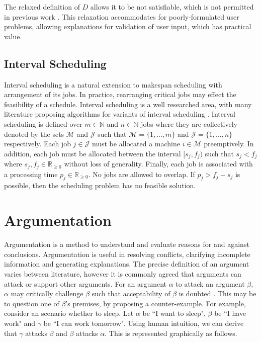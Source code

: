 The relaxed definition of $D$ allows it to be not satisfiable, which is not permitted in previous work \cite{aes}. This relaxation accommodates for poorly-formulated user problems, allowing explanations for validation of user input, which has practical value.

\subsection{Interval Scheduling}

Interval scheduling is a natural extension to makespan scheduling with arrangement of its jobs. In practice, rearranging critical jobs may effect the feasibility of a schedule. Interval scheduling is a well researched area, with many literature proposing algorithms for variants of interval scheduling \cite{is}.
\linespace
Interval scheduling is defined over $m\in\mathbb{N}$ and $n\in\mathbb{N}$ jobs where they are collectively denoted by the sets $\mathcal{M}$ and $\mathcal{J}$ such that $\mathcal{M}=\{1,...,m\}$ and $\mathcal{J}=\{1,...,n\}$ respectively. Each job $j\in\mathcal{J}$ must be allocated a machine $i\in\mathcal{M}$ preemptively. In addition, each job must be allocated between the interval $[s_j,f_j)$ such that $s_j<f_j$ where $s_j,f_j\in\mathbb{R}_{\geq 0}$ without loss of generality. Finally, each job is associated with a processing time $p_j\in\mathbb{R}_{\geq 0}$. No jobs are allowed to overlap. If $p_j>f_j-s_j$ is possible, then the scheduling problem has no feasible solution.

\section{Argumentation}

Argumentation is a method to understand and evaluate reasons for and against conclusions. Argumentation is useful in resolving conflicts, clarifying incomplete information and generating explanations. The precise definition of an argument varies between literature, however it is commonly agreed that arguments can attack or support other arguments. For an argument $\alpha$ to attack an argument $\beta$, $\alpha$ may critically challenge $\beta$ such that acceptability of $\beta$ is doubted \cite{at}. This may be to question one of $\beta$'s premises, by proposing a counter-example. For example, consider an scenario whether to sleep. Let $\alpha$ be ``I want to sleep", $\beta$ be ``I have work" and $\gamma$ be ``I can work tomorrow". Using human intuition, we can derive that $\gamma$ attacks $\beta$ and $\beta$ attacks $\alpha$. This is represented graphically as follows.


